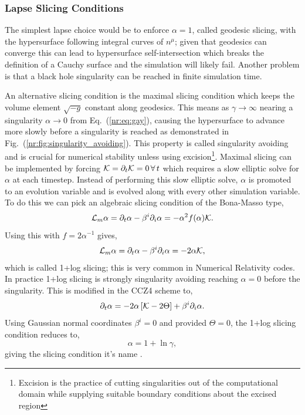 \subsubsection{Lapse Slicing Conditions}

The simplest lapse choice would be to enforce $\alpha=1$, called geodesic slicing, with the hypersurface following integral curves of $n^\mu$; given that geodesics can converge this can lead to hypersurface self-intersection which breaks the definition of a Cauchy surface and the simulation will likely fail. Another problem is that a black hole singularity can be reached in finite simulation time. 

An alternative slicing condition is the maximal slicing condition which keeps the volume element $\sqrt{-g}$ constant along geodesics. This means as $\gamma\rightarrow\infty$ nearing a singularity $\alpha\rightarrow0$ from Eq.~(\ref{nr:eq:gay}), causing the hypersurface to advance more slowly before a singularity is reached as demonstrated in Fig.~(\ref{nr:fig:singularity_avoiding}). This property is called singularity avoiding and is crucial for numerical stability unless using excision\footnote{Excision is the practice of cutting singularities out of the computational domain while supplying suitable boundary conditions about the excised region}. Maximal slicing can be implemented by forcing $\mathcal{K} = \partial_t \mathcal{K} = 0\,\forall \,t$ which requires a slow elliptic solve for $\alpha$ at each timestep. Instead of performing this slow elliptic solve, $\alpha$ is promoted to an evolution variable and is evolved along with every other simulation variable. To do this we can pick an algebraic slicing condition of the Bona-Masso type,
\begin{equation}\mathcal{L}_m \alpha = \partial_t \alpha - \beta^i \partial_i \alpha = -\alpha^2 f(\alpha)\mathcal{K}. \end{equation}
Using this with $f = 2\alpha^{-1}$ gives,
\begin{equation}\mathcal{L}_m \alpha = \partial_t \alpha - \beta^i \partial_i \alpha = -2\alpha \mathcal{K}, \label{nr:eq:1pluslog} \end{equation}
which is called 1+log slicing; this is very common in Numerical Relativity codes. In practice 1+log slicing is strongly singularity avoiding reaching $\alpha=0$ before the singularity. This is modified in the CCZ4 scheme to, 
\begin{equation}\partial_t \alpha = -2\alpha\left[ \mathcal{K}-2\Theta\right] + \beta^i \partial_i \alpha.\end{equation}
Using Gaussian normal coordinates $\beta^i=0$ and provided $\Theta=0$, the 1+log slicing condition reduces to, 
\begin{equation} \alpha = 1+ \ln \gamma,\end{equation}
giving the slicing condition it's name \cite{alcubierre2008introduction}.

